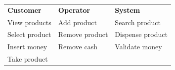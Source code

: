 \begin{center}
{\def\LTcaptype{none} %
\begin{longtable}[]{@{}
>{\raggedright\arraybackslash} p{}
>{\raggedright\arraybackslash} p{}
>{\raggedright\arraybackslash} p{}@{}}
\toprule\noalign{}
\endhead
\bottomrule\noalign{}
\endlastfoot
\begin{minipage}[t]{\linewidth}\raggedright
\textbf{Customer}
\end{minipage} & \begin{minipage}[t]{\linewidth}\raggedright
\textbf{Operator}
\end{minipage} & \begin{minipage}[t]{\linewidth}\raggedright
\textbf{System}
\end{minipage} \\
\begin{minipage}[t]{\linewidth}\raggedright
View products
\end{minipage} & \begin{minipage}[t]{\linewidth}\raggedright
Add product
\end{minipage} & \begin{minipage}[t]{\linewidth}\raggedright
Search product
\end{minipage} \\
\begin{minipage}[t]{\linewidth}\raggedright
Select product
\end{minipage} & \begin{minipage}[t]{\linewidth}\raggedright
Remove product
\end{minipage} & \begin{minipage}[t]{\linewidth}\raggedright
Dispense product
\end{minipage} \\
\begin{minipage}[t]{\linewidth}\raggedright
Insert money
\end{minipage} & \begin{minipage}[t]{\linewidth}\raggedright
Remove cash
\end{minipage} & \begin{minipage}[t]{\linewidth}\raggedright
Validate money
\end{minipage} \\
\begin{minipage}[t]{\linewidth}\raggedright
Take product
\end{minipage} & \begin{minipage}[t]{\linewidth}\raggedright

\end{minipage}
\end{longtable}}
\end{center}
